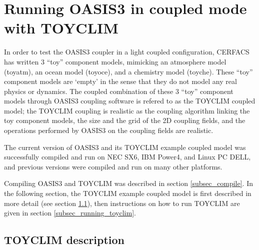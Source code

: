 %
% 
%

\section{Running OASIS3 in coupled mode with TOYCLIM}
\label{sec_coupled_mode}

In order to test the OASIS3 coupler in a light coupled configuration,
CERFACS has written 3 ``toy'' component models, mimicking an
atmosphere model (toyatm), an ocean model (toyoce), and a
chemistry model (toyche). These ``toy'' component models
are `empty' in the sense that they do not model any real physics or
dynamics. The coupled combination of these 3 ``toy'' component models
through OASIS3 coupling software is refered to as the TOYCLIM coupled
model; the TOYCLIM coupling is realistic as the coupling algorithm
linking the toy component models, the size and the grid of the
2D coupling fields, and the operations performed by
OASIS3 on the coupling fields are realistic.

The current version of OASIS3 and its TOYCLIM example coupled model
was successfully compiled and run on NEC SX6, IBM Power4, and Linux PC
DELL, and previous versions were compiled and run on many other platforms.

Compiling OASIS3 and TOYCLIM was described in section
\ref{subsec_compile}. In the following section, the TOYCLIM example
coupled model is first described in more detail (see section
\ref{subsec_toyclim}), then instructions on how to run TOYCLIM are
given in section \ref{subsec_running_toyclim}.

\subsection{TOYCLIM description}
\label{subsec_toyclim}

